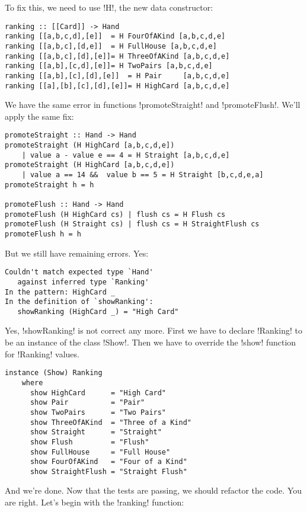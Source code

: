 \lhA \error To fix this, we need to use \il!H!, the new data constructor:
\begin{lstlisting}[frame=single]
ranking :: [[Card]] -> Hand
ranking [[a,b,c,d],[e]]  = H FourOfAKind [a,b,c,d,e]
ranking [[a,b,c],[d,e]]  = H FullHouse [a,b,c,d,e]
ranking [[a,b,c],[d],[e]]= H ThreeOfAKind [a,b,c,d,e]
ranking [[a,b],[c,d],[e]]= H TwoPairs [a,b,c,d,e]
ranking [[a,b],[c],[d],[e]]  = H Pair     [a,b,c,d,e]
ranking [[a],[b],[c],[d],[e]]= H HighCard [a,b,c,d,e] 
\end{lstlisting}
\lhN We have the same error in functions \il!promoteStraight! and \il!promoteFlush!.
\lhA \error We'll apply the same fix:
\begin{lstlisting}[frame=single]
promoteStraight :: Hand -> Hand
promoteStraight (H HighCard [a,b,c,d,e]) 
    | value a - value e == 4 = H Straight [a,b,c,d,e]
promoteStraight (H HighCard [a,b,c,d,e]) 
    | value a == 14 &&  value b == 5 = H Straight [b,c,d,e,a]
promoteStraight h = h

promoteFlush :: Hand -> Hand
promoteFlush (H HighCard cs) | flush cs = H Flush cs
promoteFlush (H Straight cs) | flush cs = H StraightFlush cs
promoteFlush h = h
\end{lstlisting}
\error But we still have remaining errors.
\lhN Yes: \\
\begin{small}
\begin{verbatim}
Couldn't match expected type `Hand' 
   against inferred type `Ranking'
In the pattern: HighCard _
In the definition of `showRanking': 
   showRanking (HighCard _) = "High Card"
\end{verbatim}
\end{small}
\lhA Yes, \il!showRanking! is not correct any more. First we have to declare \il!Ranking! to be an instance of the class \il!Show!. Then we have to override the \il!show! function for \il!Ranking! values.
\begin{lstlisting}[frame=single]
instance (Show) Ranking
    where
      show HighCard      = "High Card"
      show Pair          = "Pair" 
      show TwoPairs      = "Two Pairs" 
      show ThreeOfAKind  = "Three of a Kind" 
      show Straight      = "Straight" 
      show Flush         = "Flush" 
      show FullHouse     = "Full House" 
      show FourOfAKind   = "Four of a Kind"
      show StraightFlush = "Straight Flush"
\end{lstlisting}
\success And we're done.
\lhN Now that the tests are passing, we should refactor the code.
\lhA You are right. Let's begin with the \il!ranking! function:
